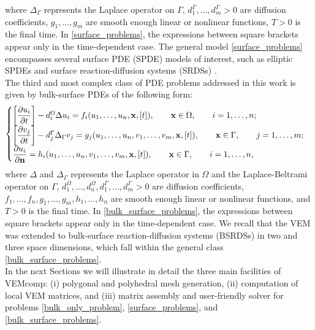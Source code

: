 \documentclass[a4paper]{article}
\begin{document}
{\begin{equation}
\end{equation}
where $\Delta_\Gamma$ represents the Laplace operator on $\Gamma$, $d_1^\Gamma,\dots, d_m^\Gamma > 0$ are diffusion coefficients,  $g_1, \dots, g_m$ are smooth enough linear or nonlinear functions, $T>0$ is the final time. In \eqref{surface_problems}, the expressions between square brackets appear only in the time-dependent case. The general model \eqref{surface_problems} encompasses several surface PDE (SPDE) models of interest, such as elliptic SPDEs \cite{bachini2021arbitrary, frittelli2018virtual} and surface reaction-diffusion systems (SRDSs) \cite{lacitignola2017turing, lacitignola2022pattern}.\\
The third and most complex class of PDE problems addressed in this work is given by bulk-surface PDEs of the following form:
\begin{equation}
\label{bulk_surface_problems}
\begin{cases}
\left[\dfrac{\partial u_i}{\partial t}\right] - d_i^\Omega \Delta u_i = f_i(u_1,\dots,u_n, \bold x, [t]),  \qquad \bold x \in\Omega,\qquad i=1,\dots, n;\\
\left[\dfrac{\partial v_j}{\partial t}\right] - d_j^\Gamma \Delta_\Gamma v_j = g_j(u_1,\dots,u_n, v_1,\dots, v_m,\bold x, [t]), \qquad \bold x \in \Gamma,\qquad j=1,\dots,m;\\
\dfrac{\partial u_i}{\partial \bold n} = h_i(u_1,\dots,u_n,v_1,\dots,v_m,\bold x, [t]), \qquad \bold x \in \Gamma,\qquad i=1,\dots,n,
\end{cases}
\end{equation}
where $\Delta$ and $\Delta_\Gamma$ represents the Laplace operator in $\Omega$ and the Laplace-Beltrami operator on $\Gamma$, $d_1^\Omega,\dots, d_n^\Omega,  d_1^\Gamma,\dots, d_m^\Gamma > 0$ are diffusion coefficients,  $f_1, \dots, f_n, g_1,\dots,g_m,h_1,\dots,h_n$ are smooth enough linear or nonlinear functions, and $T>0$ is the final time.  In \eqref{bulk_surface_problems}, the expressions between square brackets appear only in the time-dependent case.  We recall that the VEM was extended to bulk-surface reaction-diffusion systems (BSRDSs) in two \cite{frittelli2021bulk} and three \cite{frittelli2023bsrds} space dimensions, which fall within the general class \eqref{bulk_surface_problems}. \\
In the next Sections we will illustrate in detail the three main facilities of VEMcomp: (i) polygonal and polyhedral mesh generation, (ii) computation of local VEM matrices, and (iii)  matrix assembly and user-friendly solver for problems \eqref{bulk_only_problem}, \eqref{surface_problems}, and \eqref{bulk_surface_problems}.}
\end{document}
